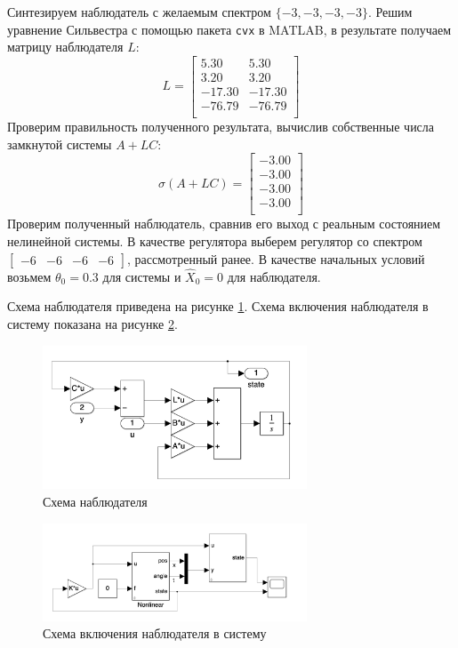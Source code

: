 Синтезируем наблюдатель с желаемым спектром $\{-3, -3, -3, -3\}$. 
Решим уравнение Сильвестра с помощью пакета \texttt{cvx} в MATLAB, в результате получаем матрицу наблюдателя $L$:
\begin{equation}
    L = \begin{bmatrix}
    5.30  & 5.30 \\ 
    3.20  & 3.20 \\ 
    -17.30  & -17.30 \\ 
    -76.79  & -76.79 \\
    \end{bmatrix}
\end{equation}
Проверим правильность полученного результата, вычислив собственные числа замкнутой системы $A + LC$: 
\begin{equation}
    \sigma(A + LC) = \begin{bmatrix}
    -3.00 \\ 
    -3.00 \\ 
    -3.00 \\ 
    -3.00 \\ 
    \end{bmatrix}
\end{equation}
Проверим полученный наблюдатель, сравнив его выход с реальным состоянием нелинейной системы. В качестве регулятора 
выберем регулятор со спектром $\begin{bmatrix}-6 & -6 & -6 & -6\end{bmatrix}$, рассмотренный ранее. В качестве 
начальных условий возьмем $\theta_0 = 0.3$ для системы и $\hat{X}_0 = 0$ для наблюдателя.

Схема наблюдателя приведена на рисунке \ref{fig:observer_scheme}. Схема включения наблюдателя в систему 
показана на рисунке \ref{fig:observer_system}. 
\begin{figure}[ht!]
    \centering
    \includegraphics[width=0.7\textwidth]{media/observer_scheme.png}
    \caption{Схема наблюдателя}
    \label{fig:observer_scheme}
\end{figure}
\begin{figure}[ht!]
    \centering
    \includegraphics[width=0.7\textwidth]{media/observer_system.png}
    \caption{Схема включения наблюдателя в систему}
    \label{fig:observer_system}
\end{figure}

